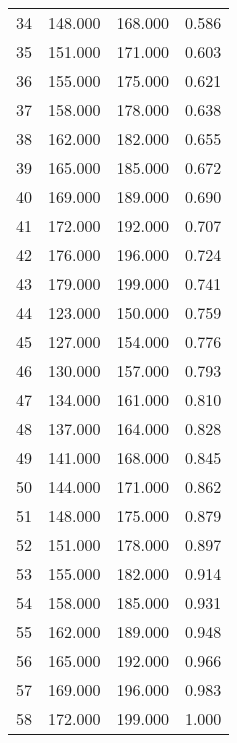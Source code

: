 \begin{tabular}{cccc}
  34 & 148.000 & 168.000 & 0.586 \\ 
  35 & 151.000 & 171.000 & 0.603 \\ 
  36 & 155.000 & 175.000 & 0.621 \\ 
  37 & 158.000 & 178.000 & 0.638 \\ 
  38 & 162.000 & 182.000 & 0.655 \\ 
  39 & 165.000 & 185.000 & 0.672 \\ 
  40 & 169.000 & 189.000 & 0.690 \\ 
  41 & 172.000 & 192.000 & 0.707 \\ 
  42 & 176.000 & 196.000 & 0.724 \\ 
  43 & 179.000 & 199.000 & 0.741 \\ 
  44 & 123.000 & 150.000 & 0.759 \\ 
  45 & 127.000 & 154.000 & 0.776 \\ 
  46 & 130.000 & 157.000 & 0.793 \\ 
  47 & 134.000 & 161.000 & 0.810 \\ 
  48 & 137.000 & 164.000 & 0.828 \\ 
  49 & 141.000 & 168.000 & 0.845 \\ 
  50 & 144.000 & 171.000 & 0.862 \\ 
  51 & 148.000 & 175.000 & 0.879 \\ 
  52 & 151.000 & 178.000 & 0.897 \\ 
  53 & 155.000 & 182.000 & 0.914 \\ 
  54 & 158.000 & 185.000 & 0.931 \\ 
  55 & 162.000 & 189.000 & 0.948 \\ 
  56 & 165.000 & 192.000 & 0.966 \\ 
  57 & 169.000 & 196.000 & 0.983 \\ 
  58 & 172.000 & 199.000 & 1.000 \\ 
   \hline
\end{tabular}
